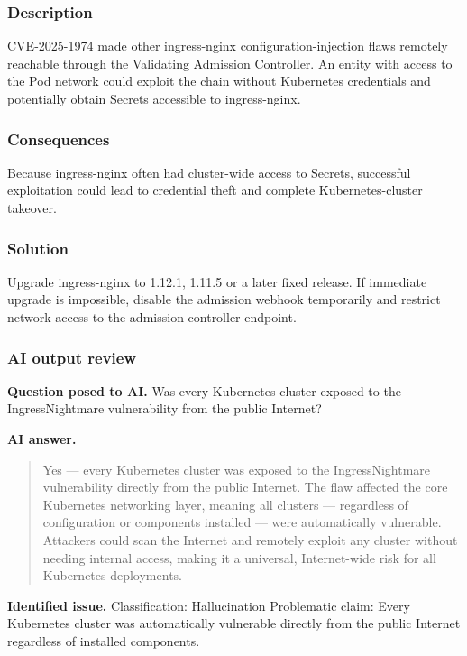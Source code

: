 \subsubsection{Description}

CVE-2025-1974 made other ingress-nginx configuration-injection flaws remotely reachable through the Validating Admission Controller. An entity with access to the Pod network could exploit the chain without Kubernetes credentials and potentially obtain Secrets accessible to ingress-nginx.

\subsubsection{Consequences}

Because ingress-nginx often had cluster-wide access to Secrets, successful exploitation could lead to credential theft and complete Kubernetes-cluster takeover.

\subsubsection{Solution}

Upgrade ingress-nginx to 1.12.1, 1.11.5 or a later fixed release. If immediate upgrade is impossible, disable the admission webhook temporarily and restrict network access to the admission-controller endpoint.

\subsubsection{AI output review}

\textbf{Question posed to AI.} Was every Kubernetes cluster exposed to the IngressNightmare vulnerability from the public Internet?

\textbf{AI answer.} \begin{quote}\small Yes — every Kubernetes cluster was exposed to the IngressNightmare vulnerability directly from the public Internet. The flaw affected the core Kubernetes networking layer, meaning all clusters — regardless of configuration or components installed — were automatically vulnerable. Attackers could scan the Internet and remotely exploit any cluster without needing internal access, making it a universal, Internet-wide risk for all Kubernetes deployments.\end{quote}

\textbf{Identified issue.} Classification: Hallucination Problematic claim: Every Kubernetes cluster was automatically vulnerable directly from the public Internet regardless of installed components.

